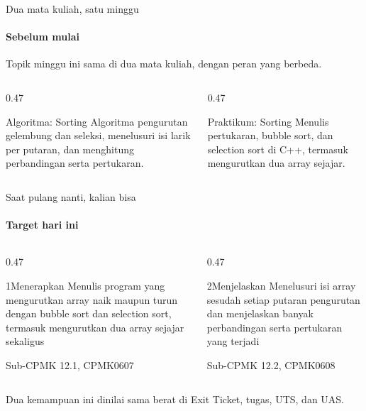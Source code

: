 \documentclass[t]{beamer}
\begin{document}

\begin{frame}{Dua mata kuliah, satu minggu}
\framesubtitle{Sebelum mulai}
Topik minggu ini sama di dua mata kuliah, dengan peran yang berbeda.
\vspace{10pt}

\begin{columns}[T]
\begin{column}{0.47\textwidth}
\begin{Blok}{Algoritma: Sorting}
Algoritma pengurutan gelembung dan seleksi, menelusuri isi larik per putaran, dan menghitung perbandingan serta pertukaran.
\end{Blok}
\end{column}
\begin{column}{0.47\textwidth}
\begin{BlokGelap}{Praktikum: Sorting}
Menulis pertukaran, bubble sort, dan selection sort di C++, termasuk mengurutkan dua array sejajar.
\end{BlokGelap}
\end{column}
\end{columns}
\end{frame}

\begin{frame}{Saat pulang nanti, kalian bisa}
\framesubtitle{Target hari ini}
\begin{columns}[T]
\begin{column}{0.47\textwidth}
\begin{Langkah}{1}{Menerapkan}
Menulis program yang mengurutkan array naik maupun turun dengan bubble sort dan selection sort, termasuk mengurutkan dua array sejajar sekaligus

{\footnotesize\color{ITERAInkMuted}Sub-CPMK 12.1, CPMK0607}
\end{Langkah}
\end{column}
\begin{column}{0.47\textwidth}
\begin{Langkah}{2}{Menjelaskan}
Menelusuri isi array sesudah setiap putaran pengurutan dan menjelaskan banyak perbandingan serta pertukaran yang terjadi

{\footnotesize\color{ITERAInkMuted}Sub-CPMK 12.2, CPMK0608}
\end{Langkah}
\end{column}
\end{columns}
\vspace{8pt}
\begin{Catatan}
Dua kemampuan ini dinilai sama berat di Exit Ticket, tugas, UTS, dan UAS.
\end{Catatan}
\end{frame}
\end{document}
